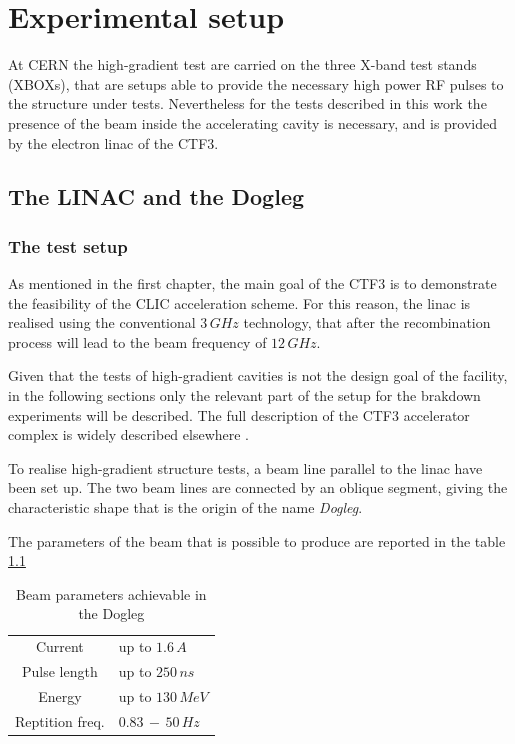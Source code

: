 \chapter[Experimental setup]{Experimental setup}

At CERN the high-gradient test are carried on the three X-band test stands (XBOXs), that are setups able to provide the necessary high power RF pulses to the structure under tests. Nevertheless for the tests described in this work the presence of the beam inside the accelerating cavity is necessary, and is provided by the electron linac of the CTF3. 


\section[Linac and dogleg]{The LINAC and the Dogleg}

\subsection[The test setup]{The test setup}
As mentioned in the first chapter, the main goal of the CTF3 is to demonstrate the feasibility of the CLIC acceleration scheme. For this reason, the linac is realised using the conventional $3\,GHz$ technology, that after the recombination process will lead to the beam frequency of $12\,GHz$. 

Given that the tests of high-gradient cavities is not the design goal of the facility, in the following sections only the relevant part of the setup for the brakdown experiments will be described. The full description of the CTF3 accelerator complex is widely described elsewhere \cite{CLIC:cdr,CTF:drive_beam,ctf3:dr}.

To realise high-gradient structure tests, a beam line parallel to the linac have been set up. The two beam lines are connected by an oblique segment, giving the characteristic shape that is the origin of the name \textit{Dogleg}.

The parameters of the beam that is possible to produce are reported in the table \ref{beam_par_dogleg}


\begin{table}
  \centering
    \begin{tabular}{ c l }
    \hline
    Current 		&	up to $1.6\,A$\\
    Pulse length		&	up to $250\,ns$\\
    Energy			&	up to $130\, MeV$\\
    Reptition freq.	&	$0.83\,-\,50\, Hz$\\

    \hline
    \end{tabular}
\caption{Beam parameters achievable in the Dogleg \cite{NavarroQuirante:2025954}}
\label{beam_par_dogleg}
\end{table}



